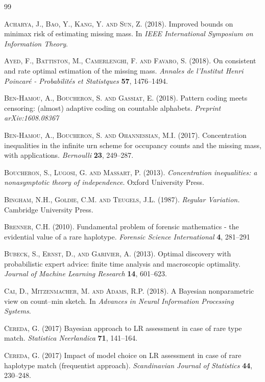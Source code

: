 \documentclass{article}
\newcommand{\1}{\boldsymbol{1}}
\theoremstyle{plain}
\begin{document}
\begin{thebibliography}{99}

\textsc{Acharya, J., Bao, Y., Kang, Y. and Sun, Z.} (2018). Improved bounds on minimax risk of estimating missing mass. In \textit{IEEE International Symposium on Information Theory}.

\textsc{Ayed, F., Battiston, M., Camerlenghi, F. and Favaro, S.} (2018). On consistent and rate optimal estimation of the missing mass. \textit{Annales de l'Institut Henri Poincar\'e - Probabilit\'es et Statistques} \textbf{57}, 1476--1494.  

\textsc{Ben-Hamou, A., Boucheron, S. and Gassiat, E.} (2018). Pattern coding meets censoring: (almost) adaptive coding on countable alphabets. \textit{Preprint arXiv:1608.08367}

\textsc{Ben-Hamou, A., Boucheron, S. and Ohannessian, M.I.} (2017). Concentration inequalities in the infinite urn scheme for occupancy counts and the missing mass, with applications. \textit{Bernoulli} \textbf{23}, 249--287.

\textsc{Boucheron, S., Lugosi, G. and Massart, P.} (2013). \textit{Concentration inequalities: a nonasymptotic theory of independence}. Oxford University Press.

\textsc{Bingham, N.H., Goldie, C.M. and Teugels, J.L.} (1987). \textit{Regular Variation.} Cambridge University Press.

\textsc{Brenner, C.H.} (2010). Fundamental problem of forensic mathematics - the evidential value of a rare haplotype. \textit{Forensic Science International} \textbf{4}, 281--291

\textsc{Bubeck, S., Ernst, D., and Garivier, A.} (2013). Optimal discovery with probabilistic  expert  advice:  finite  time  analysis  and  macroscopic optimality. \textit{Journal of Machine Learning Research} \textbf{14}, 601--623.

\textsc{Cai, D., Mitzenmacher, M. and Adams, R.P.} (2018). A Bayesian nonparametric view on count--min sketch. In \textit{Advances in Neural Information Processing Systems}.

\textsc{Cereda, G.} (2017) Bayesian approach to LR assessment in case of rare type match. \textit{Statistica Neerlandica} \textbf{71}, 141--164.

\textsc{Cereda, G.} (2017) Impact of model choice on LR assessment in case of rare haplotype match (frequentist approach). \textit{Scandinavian Journal of Statistics} \textbf{44}, 230--248.


\end{thebibliography}
\end{document}
